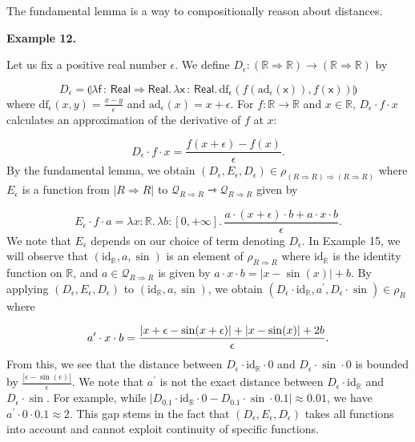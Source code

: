  
The fundamental lemma is a way to compositionally reason about distances.\par
 
 
 
\par\medskip\noindent\textbf{Example 12.}\par
 
 
Let us fix a positive real number $\epsilon$. We define $D_{\epsilon}\colon(\mathbb{R}\Rightarrow\mathbb{R})\to(\mathbb{R}\Rightarrow%
\mathbb{R})$ by\par
    \[D_{\epsilon}=\llparenthesis\lambda\mathsf{f}\,{:}\,\mathsf{Real}\Rightarrow%
\mathsf{Real}.\,\lambda\mathsf{x}\,{:}\,\mathsf{Real}.\,\mathrm{df}_{\epsilon}%
(f(\mathrm{ad}_{\epsilon}(\mathsf{x})),f(\mathsf{x}))\rrparenthesis\]    
where $\mathrm{df}_{\epsilon}(x,y)=\frac{x-y}{\epsilon}$ and $\mathrm{ad}_{\epsilon}(x)=x+\epsilon$. For $f\colon\mathbb{R}\to\mathbb{R}$ and $x\in\mathbb{R}$, $D_{\epsilon}\cdot f\cdot x$ calculates an approximation of the derivative of $f$ at $x$:\par
    \[D_{\epsilon}\cdot f\cdot x=\frac{f(x+\epsilon)-f(x)}{\epsilon}.\]    
By the fundamental lemma, we obtain $(D_{\epsilon},E_{\epsilon},D_{\epsilon})\in\rho_{(R\Rightarrow R)\Rightarrow(R%
\Rightarrow R)}$ where $E_{\epsilon}$ is a function from $|R\Rightarrow R|$ to $\mathcal{Q}_{R\Rightarrow R}\rightarrowtriangle\mathcal{Q}_{R\Rightarrow R}$ given by\par
    \[E_{\epsilon}\cdot f\cdot a=\lambda x:\mathbb{R}.\,\lambda b:[0,+\infty].\,%
\frac{a\cdot(x+\epsilon)\cdot b+a\cdot x\cdot b}{\epsilon}.\]    
We note that $E_{\epsilon}$ depends on our choice of term denoting $D_{\epsilon}$. In Example 15, we will observe that $(\mathrm{id}_{\mathbb{R}},a,\sin)$ is an element of $\rho_{R\Rightarrow R}$ where $\mathrm{id}_{\mathbb{R}}$ is the identity function on $\mathbb{R}$, and $a\in\mathcal{Q}_{R\Rightarrow R}$ is given by $a\cdot x\cdot b=|x-\sin(x)|+b$. By applying $(D_{\epsilon},E_{\epsilon},D_{\epsilon})$ to $(\mathrm{id}_{\mathbb{R}},a,\sin)$, we obtain $(D_{\epsilon}\cdot\mathrm{id}_{\mathbb{R}},a^{\prime},D_{\epsilon}\cdot\sin)%
\in\rho_{R}$ where\par
    \[a^{\prime}\cdot x\cdot b=\frac{|x+\epsilon-\sin(x+\epsilon)|+|x-\sin(x)|+2b}{%
\epsilon}.\]    
From this, we see that the distance between $D_{\epsilon}\cdot\mathrm{id}_{\mathbb{R}}\cdot 0$ and $D_{\epsilon}\cdot{\sin}\cdot 0$ is bounded by $\frac{|\epsilon-\sin(\epsilon)|}{\epsilon}$. We note that $a^{\prime}$ is not the exact distance between $D_{\epsilon}\cdot\mathrm{id}_{\mathbb{R}}$ and $D_{\epsilon}\cdot\sin$. For example, while $|D_{0.1}\cdot\mathrm{id}_{\mathbb{R}}\cdot 0-D_{0.1}\cdot{\sin}\cdot 0.1|%
\approx 0.01$, we have $a^{\prime}\cdot 0\cdot 0.1\approx 2$. This gap stems in the fact that $(D_{\epsilon},E_{\epsilon},D_{\epsilon})$ takes all functions into account and cannot exploit continuity of specific functions.\par
 
